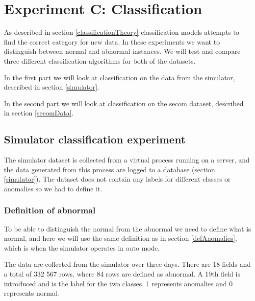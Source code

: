 \documentclass[english, a4paper]{report}
\begin{document}
{    \section{Experiment C: Classification} \label{experimentClassification}
    {
        As described in section \ref{classificationTheory} classification models attempts to find the correct category for new data. In these experiments we want to distinguish between normal and abnormal instances. We will test and compare three different classification algorithms for both of the datasets.\par
        In the first part we will look at classification on the data from the simulator, described in section \ref{simulator}. 
        \par
        In the second part we will look at classification on the \gls{secom} dataset, described in section \ref{secomData}.
        
        \subsection{Simulator classification experiment} \label{simulator-classification-experiment}
        {
            The simulator dataset is collected from a virtual process running on a server, and the data generated from this process are logged to a database (section \ref{simulator}). The dataset does not contain any labels for different classes or anomalies so we had to define it.
            
            \subsubsection{Definition of abnormal}
            {
                To be able to distinguish the normal from the abnormal we need to define what is normal, and here we will use the same definition as in section \ref{defAnomalies}, which is when the simulator operates in auto mode. 
                \par
                The data are collected from the simulator over three days. There are 18 fields and a total of 332 567 rows, where 84 rows are defined as abnormal. A 19th field is introduced and is the label for the two classes. 1 represents anomalies and 0 represents normal.
            }
            
}}}
\end{document}
